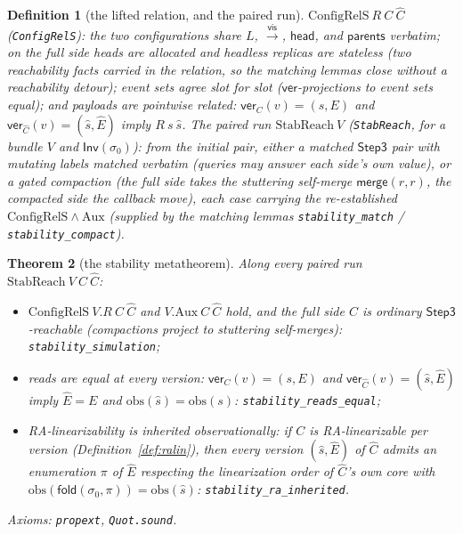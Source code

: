 \documentclass[11pt]{article}
\newtheorem{theorem}{Theorem}[section]
\newtheorem{definition}[theorem]{Definition}
\newcommand{\vis}{\xrightarrow{\mathsf{vis}}}
\newcommand{\Sinit}{\sigma_0}
\newcommand{\lean}[1]{\texttt{#1}}
\newcommand{\fold}{\mathsf{fold}}
\newcommand{\Inv}{\mathsf{Inv}}
\begin{document}
\begin{definition}[the lifted relation, and the paired run]
\label{def:stabreach}
$\mathrm{ConfigRelS}\ R\ C\ \hat{C}$ (\lean{ConfigRelS}): the two
configurations share $L$, $\vis$, $\mathsf{head}$, and
$\mathsf{parents}$ verbatim; on the full side heads are allocated and
headless replicas are stateless (two reachability facts carried in the
relation, so the matching lemmas close without a reachability detour);
event sets agree slot for slot
($\mathsf{ver}$-projections to event sets equal); and payloads are
pointwise related: $\mathsf{ver}_C(v) = (s, E)$ and
$\mathsf{ver}_{\hat{C}}(v) = (\hat{s}, \hat{E})$ imply
$R\ s\ \hat{s}$. The \emph{paired run} $\mathrm{StabReach}\ V$
(\lean{StabReach}, for a bundle $V$ and $\Inv(\Sinit)$): from the
initial pair, either a matched $\mathsf{Step3}$ pair with mutating
labels matched verbatim (queries may answer each side's own value), or
a gated compaction (the full side takes the stuttering self-merge
$\mathsf{merge}(r, r)$, the compacted side the callback move), each
case carrying the re-established
$\mathrm{ConfigRelS} \wedge \mathrm{Aux}$ (supplied by the matching
lemmas \lean{stability\_match} / \lean{stability\_compact}).
\end{definition}

\begin{theorem}[the stability metatheorem]
\label{thm:stabsim}
Along every paired run $\mathrm{StabReach}\ V\ C\ \hat{C}$:
\begin{itemize}[leftmargin=2.2em]
\item[(i)] $\mathrm{ConfigRelS}\ V\!.R\ C\ \hat{C}$ and
  $V\!.\mathrm{Aux}\ C\ \hat{C}$ hold, and the full side $C$ is
  ordinary $\mathsf{Step3}$-reachable (compactions project to
  stuttering self-merges): \lean{stability\_simulation};
\item[(ii)] reads are equal at every version: $\mathsf{ver}_C(v) =
  (s, E)$ and $\mathsf{ver}_{\hat{C}}(v) = (\hat{s}, \hat{E})$ imply
  $\hat{E} = E$ and $\mathrm{obs}(\hat{s}) = \mathrm{obs}(s)$:
  \lean{stability\_reads\_equal};
\item[(iii)] RA-linearizability is inherited observationally: if $C$ is
  RA-linearizable per version (Definition~\ref{def:ralin}), then every
  version $(\hat{s}, \hat{E})$ of $\hat{C}$ admits an enumeration $\pi$
  of $\hat{E}$ respecting the linearization order of $\hat{C}$'s
  \emph{own} core with $\mathrm{obs}(\fold(\Sinit, \pi)) =
  \mathrm{obs}(\hat{s})$: \lean{stability\_ra\_inherited}.
\end{itemize}
Axioms: \lean{propext}, \lean{Quot.sound}.
\end{theorem}
\end{document}
